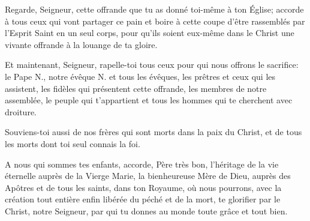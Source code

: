 Regarde, Seigneur, cette offrande
que tu as donné toi-même à ton Église;
accorde à tous ceux qui vont partager ce pain
et boire à cette coupe
d'être rassemblés par l'Esprit Saint en un seul corps,
pour qu'ils soient eux-même dans le Christ
une vivante offrande
à la louange de ta gloire.

Et maintenant, Seigneur, rapelle-toi
tous ceux pour qui nous offrons le sacrifice:
le Pape N.,
notre évêque N. et tous les évêques,
les prêtres et ceux qui les assistent,
les fidèles qui présentent cette offrande,
les membres de notre assemblée, 
le peuple qui t'appartient
et tous les hommes qui te cherchent avec droiture.

Souviens-toi aussi
de nos frères qui sont morts dans la paix du Christ,
et de tous les morts dont toi seul connais la foi.

A nous qui sommes tes enfants,
accorde, Père très bon,
l'héritage de la vie éternelle
auprès de la Vierge Marie,
la bienheureuse Mère de Dieu,
auprès des Apôtres et de tous les saints,
dans ton Royaume,
où nous pourrons,
avec la création tout entière
enfin libérée du péché et de la mort,
te glorifier
par le Christ, notre Seigneur,
par qui tu donnes au monde
toute grâce et tout bien. 


